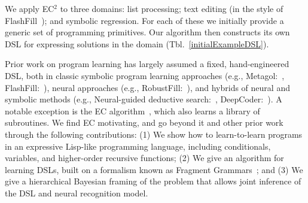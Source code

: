 \documentclass{article}
\newcommand{\system}{\textsc{EC$^2$} }
\begin{document}
We apply \system to three domains:
list processing; text editing (in the style of FlashFill~\cite{gulwani2011automating}); and symbolic regression.
 For each of these we initially provide a generic
 set of programming primitives.
Our algorithm then constructs
its own DSL for expressing solutions in the domain (Tbl.~\ref{initialExampleDSL}).


Prior work on program learning has largely assumed a fixed, hand-engineered DSL,
both in classic symbolic program learning approaches (e.g., Metagol:~\cite{muggleton2015meta},
FlashFill:~\cite{gulwani2011automating}),
neural approaches  (e.g., RobustFill:~\cite{devlin2017robustfill}), and hybrids of neural and
symbolic methods (e.g., Neural-guided deductive search:~\cite{ngds}, DeepCoder:~\cite{balog2016deepcoder}).
A notable exception is the EC algorithm~\cite{Dechter:2013:BLV:2540128.2540316},
which also learns a library of subroutines.
We find EC motivating, and go beyond it and other prior work through the following contributions:%
(1) We show how to learn-to-learn programs in an expressive Lisp-like programming language, including conditionals, variables, and higher-order recursive functions;
(2) We give an algorithm for learning DSLs,
built on a formalism known as Fragment Grammars~\cite{tim};
and (3) We give a hierarchical Bayesian framing of
the problem that
allows joint inference of the DSL and neural recognition model.



 


\end{document}
